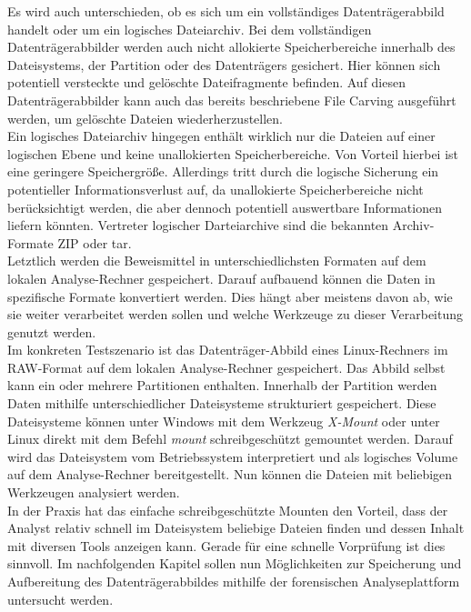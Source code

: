 \noindent
Es wird auch unterschieden, ob es sich um ein vollständiges Datenträgerabbild handelt oder um ein logisches Dateiarchiv. Bei dem vollständigen Datenträgerabbilder werden auch nicht allokierte Speicherbereiche innerhalb des Dateisystems, der Partition oder des Datenträgers gesichert. Hier können sich potentiell versteckte und gelöschte Dateifragmente befinden. Auf diesen Datenträgerabbilder kann auch das bereits beschriebene File Carving ausgeführt werden, um gelöschte Dateien wiederherzustellen.\\ 
Ein logisches Dateiarchiv hingegen enthält wirklich nur die Dateien auf einer logischen Ebene und keine unallokierten Speicherbereiche. Von Vorteil hierbei ist eine geringere Speichergröße. Allerdings tritt durch die logische Sicherung ein potentieller Informationsverlust auf, da unallokierte Speicherbereiche nicht berücksichtigt werden, die aber dennoch potentiell auswertbare Informationen liefern könnten. Vertreter logischer Darteiarchive sind die bekannten Archiv-Formate ZIP oder \acrshort{tar}.\\

\noindent
Letztlich werden die Beweismittel in unterschiedlichsten Formaten auf dem lokalen Analyse-Rechner gespeichert. Darauf aufbauend können die Daten in spezifische Formate konvertiert werden. Dies hängt aber meistens davon ab, wie sie weiter verarbeitet werden sollen und welche Werkzeuge zu dieser Verarbeitung genutzt werden.\\

\noindent
Im konkreten Testszenario ist das Datenträger-Abbild eines Linux-Rechners im RAW-Format auf dem lokalen Analyse-Rechner gespeichert. Das Abbild selbst kann ein oder mehrere Partitionen enthalten. Innerhalb der Partition werden Daten mithilfe unterschiedlicher Dateisysteme strukturiert gespeichert. Diese Dateisysteme können unter Windows mit dem Werkzeug \textit{X-Mount} oder unter Linux direkt mit dem Befehl \textit{mount} schreibgeschützt gemountet werden. Darauf wird das Dateisystem vom Betriebssystem interpretiert und als logisches Volume auf dem Analyse-Rechner bereitgestellt. Nun können die Dateien mit beliebigen Werkzeugen analysiert werden.\\

\noindent
In der Praxis hat das einfache schreibgeschützte Mounten den Vorteil, dass der Analyst relativ schnell im Dateisystem beliebige Dateien finden und dessen Inhalt mit diversen Tools anzeigen kann. Gerade für eine schnelle Vorprüfung ist dies sinnvoll. Im nachfolgenden Kapitel sollen nun Möglichkeiten zur Speicherung und Aufbereitung des Datenträgerabbildes mithilfe der forensischen Analyseplattform untersucht werden.\\

